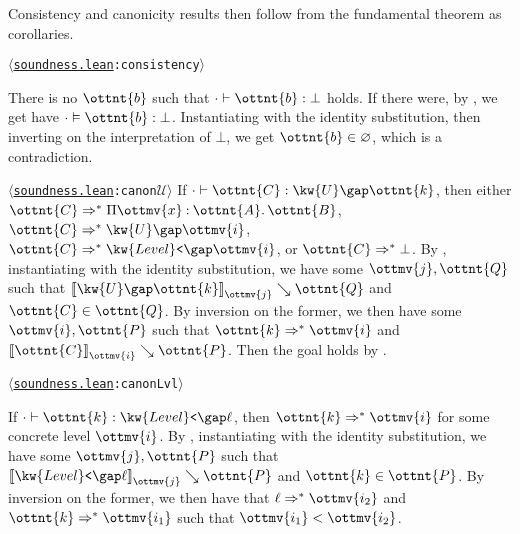 \documentclass[a4paper,UKenglish,cleveref,autoref,thm-restate]{lipics-v2021}
\newcommand{\repo}{https://github.com/ionathanch/TTBFL}
\newcommand{\thmref}[2]{%
  $\langle$\href{\repo/tree/main/src/#1}{\texttt{#1}}\texttt{:#2}$\rangle$%
}
\begin{document}
Consistency and canonicity results then follow from the fundamental theorem as corollaries.

\begin{corollary}[Consistency] \thmref{soundness.lean}{consistency}
  There is no $\ottnt{b}$ such that $  \cdot   \vdash  \ottnt{b}  \mathrel{:}   \bot  $ holds.
  If there were, by ,
  we get have $  \cdot   \vDash  \ottnt{b}  :   \bot  $.
  Instantiating with the identity substitution,
  then inverting on the interpretation of $ \bot $,
  we get $ \ottnt{b}  \in   \varnothing  $, which is a contradiction.
\end{corollary}

\begin{corollary} \thmref{soundness.lean}{canon$\mathcal{U}$} \label{lem:canon:univ}
  If $  \cdot   \vdash  \ottnt{C}  \mathrel{:}   \kw{U} \gap  \ottnt{k}  $,
  then either $ \ottnt{C}  \Rightarrow^\ast   \Pi  \ottmv{x}  \mathbin{:}  \ottnt{A}  \mathpunct{.}  \ottnt{B}  $, $ \ottnt{C}  \Rightarrow^\ast   \kw{U} \gap   \ottmv{i}   $, $ \ottnt{C}  \Rightarrow^\ast   \kw{Level}\texttt{<} \gap   \ottmv{i}   $, or $ \ottnt{C}  \Rightarrow^\ast   \bot  $.
  By ,
  instantiating with the identity substitution,
  we have some $\ottmv{j}, \ottnt{Q}$ such that $ \mathopen{\llbracket}   \kw{U} \gap  \ottnt{k}   \mathclose{\rrbracket}_{ \ottmv{j} } \searrow  \ottnt{Q} $ and $ \ottnt{C}  \in  \ottnt{Q} $.
  By inversion on the former,
  we then have some $\ottmv{i}, \ottnt{P}$ such that $ \ottnt{k}  \Rightarrow^\ast   \ottmv{i}  $ and $ \mathopen{\llbracket}  \ottnt{C}  \mathclose{\rrbracket}_{ \ottmv{i} } \searrow  \ottnt{P} $.
  Then the goal holds by .
\end{corollary}

\begin{corollary} \thmref{soundness.lean}{canonLvl}
  If $  \cdot   \vdash  \ottnt{k}  \mathrel{:}   \kw{Level}\texttt{<} \gap  \ell  $,
  then $ \ottnt{k}  \Rightarrow^\ast   \ottmv{i}  $ for some concrete level $\ottmv{i}$.
  By ,
  instantiating with the identity substitution,
  we have some $\ottmv{j}, \ottnt{P}$ such that $ \mathopen{\llbracket}   \kw{Level}\texttt{<} \gap  \ell   \mathclose{\rrbracket}_{ \ottmv{j} } \searrow  \ottnt{P} $ and $ \ottnt{k}  \in  \ottnt{P} $.
  By inversion on the former,
  we then have that $ \ell  \Rightarrow^\ast   \ottmv{i_{{\mathrm{2}}}}  $ and $ \ottnt{k}  \Rightarrow^\ast   \ottmv{i_{{\mathrm{1}}}}  $ such that $ \ottmv{i_{{\mathrm{1}}}}  <  \ottmv{i_{{\mathrm{2}}}} $.
\end{corollary}
\end{document}
